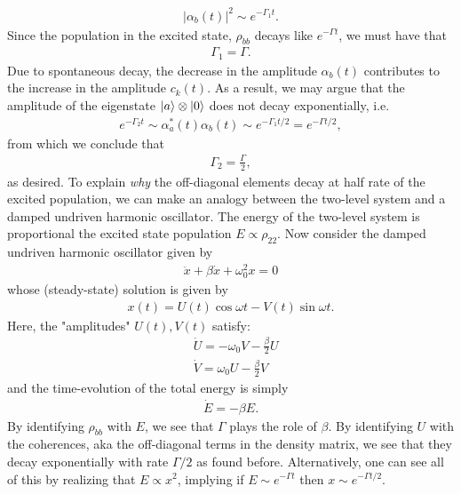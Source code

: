 \documentclass{article}
\theoremstyle{definition}
\newcommand{\al}{\alpha}
\newcommand{\be}{\beta}
\newcommand{\f}[2]{\frac{#1}{#2}}
\begin{document}
\begin{enumerate}[label=(\alph*)]
\begin{enumerate}[label=(\roman*)]
\begin{align*}
		|\al_b(t)|^2 \sim e^{-\Gamma_1 t}. 
		\end{align*}
		Since the population in the excited state, $\rho_{bb}$ decays like $e^{-\Gamma t}$, we must have that
		\begin{align*}
		\Gamma_1 = \Gamma.
		\end{align*}
		Due to spontaneous decay, the decrease in the amplitude $\al_b(t)$ contributes to the increase in the amplitude $c_k(t)$. As a result, we may argue that the amplitude of the eigenstate $\ket{a} \otimes \ket{0}$ does not decay exponentially, i.e.  
		\begin{align*}
		e^{-\Gamma_2 t} \sim \al_a^*(t) \al_b(t)  \sim e^{-\Gamma_1 t/2}  = e^{-\Gamma t /2},
		\end{align*}
		from which we conclude that 
		\begin{align*}
		\Gamma_2 = \f{\Gamma}{2},
		\end{align*}
		as desired. To explain \textit{why} the off-diagonal elements decay at half rate of the excited population, we can make an analogy between the two-level system and a damped undriven harmonic oscillator. The energy of the two-level system is proportional the excited state population $E \propto \rho_{22}$. Now consider the damped undriven harmonic oscillator given by 
		\begin{align*}
		\ddot{x} + \be \dot{x} + \omega_0^2 x = 0
		\end{align*}
		whose (steady-state) solution is given by 
		\begin{align*}
		x(t) = U(t)\cos \omega t - V(t)\sin\omega t.
		\end{align*} 
		Here, the "amplitudes" $U(t), V(t)$ satisfy:
		\begin{align*}
		&\dot{U} = -\omega_0 V- \f{\be}{2} U \\ 
		&\dot{V} = \omega_0 U - \f{\be}{2}V
		\end{align*}
		and the time-evolution of the total energy is simply
		\begin{align*}
		\dot E = -\be E.
		\end{align*}
		By identifying $\rho_{bb}$ with $E$, we see that $\Gamma$ plays the role of $\be$. By identifying $U$ with the coherences, aka the off-diagonal terms in the density matrix, we see that they decay exponentially with rate $\Gamma/2$ as found before. Alternatively, one can see all of this by realizing that $E\propto x^2$, implying if $E\sim e^{-\Gamma t}$ then $x\sim e^{-\Gamma t/2 }$.
	\end{enumerate}
	


\end{enumerate}
\end{document}
